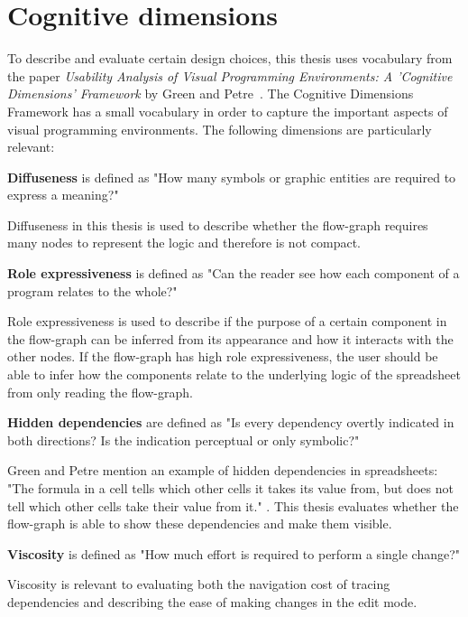 \section{Cognitive dimensions}
To describe and evaluate certain design choices, this thesis uses vocabulary from the paper \textit{Usability Analysis of Visual Programming Environments: A 'Cognitive Dimensions' Framework} by Green and Petre~\cite{green_usability_1996}. The Cognitive Dimensions Framework has a small vocabulary in order to capture the important aspects of visual programming environments. The following dimensions are particularly relevant:

\begin{definition}
    \label{def:diffuseness}
    \textbf{Diffuseness} is defined as "How many symbols or graphic entities are required to express a meaning?" \cite[p.~138]{green_usability_1996}
\end{definition}
Diffuseness in this thesis is used to describe whether the flow-graph requires many nodes to represent the logic and therefore is not compact.

\begin{definition}
    \label{def:role-expressiveness}
    \textbf{Role expressiveness} is defined as "Can the reader see how each component of a program relates to the whole?" \cite[p.~139]{green_usability_1996}
\end{definition}
Role expressiveness is used to describe if the purpose of a certain component in the flow-graph can be inferred from its appearance and how it interacts with the other nodes. If the flow-graph has high role expressiveness, the user should be able to infer how the components relate to the underlying logic of the spreadsheet from only reading the flow-graph.

\begin{definition}
    \label{def:hidden-dependencies}
    \textbf{Hidden dependencies} are defined as "Is every dependency overtly indicated in both directions? Is the indication perceptual or only symbolic?" \cite[p.~139]{green_usability_1996}
\end{definition}
Green and Petre mention an example of hidden dependencies in spreadsheets: "The formula in a cell tells which other cells it takes its value from, but does not tell which other cells take their value from it." \cite[p.~154]{green_usability_1996}. This thesis evaluates whether the flow-graph is able to show these dependencies and make them visible.

\begin{definition}
    \label{def:viscosity}
    \textbf{Viscosity} is defined as "How much effort is required to perform a single change?" \cite[p.~139]{green_usability_1996}
\end{definition}
Viscosity is relevant to evaluating both the navigation cost of tracing dependencies and describing the ease of making changes in the edit mode.

